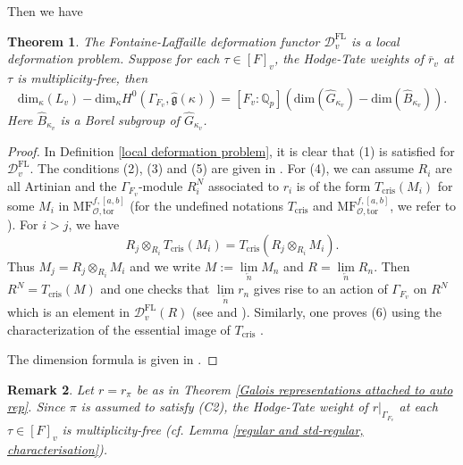\documentclass[12pt,oneside,reqno]{amsart}
\newcommand{\Q}{\mathbb{Q}}
\theoremstyle{plain}
\newtheorem{theorem}{Theorem}[section]
\newtheorem{remark}[theorem]{Remark}
\begin{document}
	
	Then we have
	\begin{theorem}\label{crystalline deformation-dimension defaut}
		The Fontaine-Laffaille deformation functor $\mathcal{D}_v^\mathrm{FL}$ is a local deformation problem. Suppose for each $\tau\in[F]_v$, the Hodge-Tate weights of $\overline{r}_v$ at $\tau$ is \emph{multiplicity-free}, then
		\[
		\mathrm{dim}_{\kappa}(L_v)
		-
		\mathrm{dim}_{\kappa}H^0(\Gamma_{F_v},\widehat{\mathfrak{g}}(\kappa))
		=
		[F_v:\Q_p]
		(\mathrm{dim}(\widehat{G}_{\kappa_v})-\mathrm{dim}(\widehat{B}_{\kappa_v})).
		\]
		Here $\widehat{B}_{\kappa_v}$ is a Borel subgroup of $\widehat{G}_{\kappa_v}$.
	\end{theorem}
	\begin{proof}
		In Definition \ref{local deformation problem}, it is clear that (1) is satisfied for $\mathcal{D}_v^\mathrm{FL}$. The conditions (2), (3) and (5) are given in \cite[Corollary 5.6]{Booher2019}. For (4), we can assume $R_i$ are all Artinian and the $\Gamma_{F_v}$-module $R_i^N$ associated to $r_i$ is of the form $T_{\mathrm{cris}}(M_i)$ for some $M_i$ in $\mathrm{MF}_{\mathcal{O},\mathrm{tor}}^{f,[a,b]}$ (for the undefined notations $T_{\mathrm{cris}}$ and $\mathrm{MF}_{\mathcal{O},\mathrm{tor}}^{f,[a,b]}$, we refer to \cite{Booher2019}). For $i>j$, we have
		\[
		R_j\otimes_{R_i}T_{\mathrm{cris}}(M_i)
		=
		T_{\mathrm{cris}}(R_j\otimes_{R_i}M_i).
		\]
		Thus $M_j=R_j\otimes_{R_i}M_i$ and we write $M:=\lim\limits_{\overleftarrow{n}}M_n$ and $R=\lim\limits_{\overleftarrow{n}}R_n$. Then $R^N=T_{\mathrm{cris}}(M)$ and one checks that $\lim\limits_{\overleftarrow{n}}r_n$ gives rise to an action of $\Gamma_{F_v}$ on $R^N$ which is an element in $\mathcal{D}_v^\mathrm{FL}(R)$ (see \cite[§5.1]{Booher2019} and \cite{Ramakrishna1993}). Similarly, one proves (6) using the characterization of the essential image of $T_{\mathrm{cris}}$ \cite[Corollary 5.5]{Booher2019}.
		
		
		
		
		
		The dimension formula is given in \cite[Theorem 5.2]{Booher2019}. 
	\end{proof}
	
	
	
	
	
	\begin{remark}\rm
		Let $r=r_\pi$ be as in Theorem \ref{Galois representations attached to auto rep}. Since $\pi$ is assumed to satisfy (C2), the Hodge-Tate weight of $r|_{\Gamma_{F_v}}$ at each $\tau\in[F]_v$ is multiplicity-free (\emph{cf.} Lemma \ref{regular and std-regular, characterisation}).
	\end{remark}
	
\end{document}
